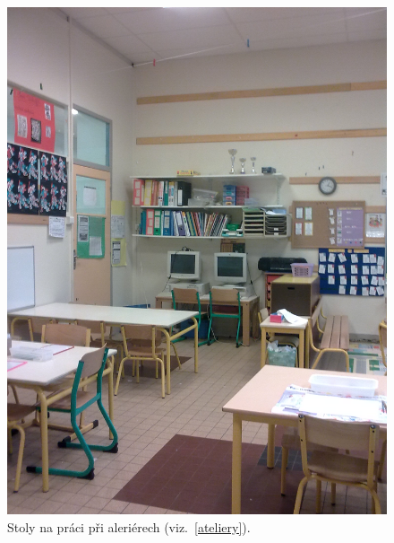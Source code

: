 	\begin{figure}[tb]
		\centering
		\includegraphics[height=0.35\textheight]{./fotky/Obr13.jpg}
		\caption{
			Stoly na práci při aleriérech (viz.~\ref{ateliery}).
		}
		\label{Obr13}
	\end{figure}
